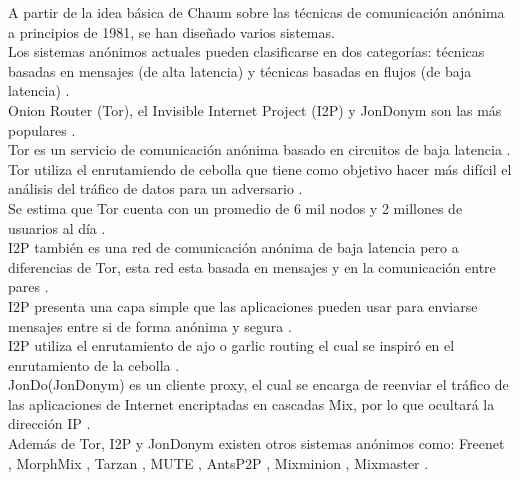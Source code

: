 \documentclass[10pt,letterpaper]{article}
\begin{document}
\begin{titlepage}
\end{titlepage}


A partir de la idea básica de Chaum \cite{chaum1981untraceable} sobre las técnicas de comunicación anónima a principios de 1981, se han diseñado varios sistemas. \\

Los sistemas anónimos actuales pueden clasificarse en dos categorías: técnicas basadas en mensajes (de alta latencia) y técnicas basadas en flujos (de baja latencia) \cite{wang2011potential}. \\

Onion Router (Tor), el Invisible Internet Project (I2P) y JonDonym son las más populares \cite{montieri2017anonymity}.\\

Tor es un servicio de comunicación anónima basado en circuitos de baja latencia \cite{dingledine2004tor}.\\

Tor utiliza el enrutamiendo de cebolla que tiene como objetivo hacer más difícil el análisis del tráfico de datos para un adversario \cite{danezis2008survey}. \\

Se estima que Tor cuenta con un promedio de 6 mil nodos y 2 millones de usuarios al día \cite{Tor}.\\

I2P también es una red de comunicación anónima de baja latencia pero a diferencias de Tor, esta red esta basada en mensajes y en la comunicación entre pares \cite{conrad2014survey}. \\

I2P presenta una capa simple que las aplicaciones pueden usar para enviarse mensajes entre si de forma anónima y segura \cite{I2P}.\\


I2P utiliza el enrutamiento de ajo o garlic routing el cual se inspiró en el enrutamiento de la cebolla \cite{zantout2011i2p}.\\

JonDo(JonDonym) es un cliente proxy, el cual se encarga de reenviar el tráfico de las aplicaciones de Internet encriptadas en cascadas Mix, por lo que ocultará la dirección IP \cite{JonDonym}.\\

Además de Tor, I2P y JonDonym existen otros sistemas anónimos como: Freenet \cite{Freenetproject}, MorphMix \cite{rennhard2002introducing} , Tarzan \cite{freedman2002tarzan}, MUTE \cite{Mute}, AntsP2P \cite{AntsP2P}, Mixminion \cite{Mixminion}, Mixmaster \cite{Mixmaster}.\\
\end{document}
